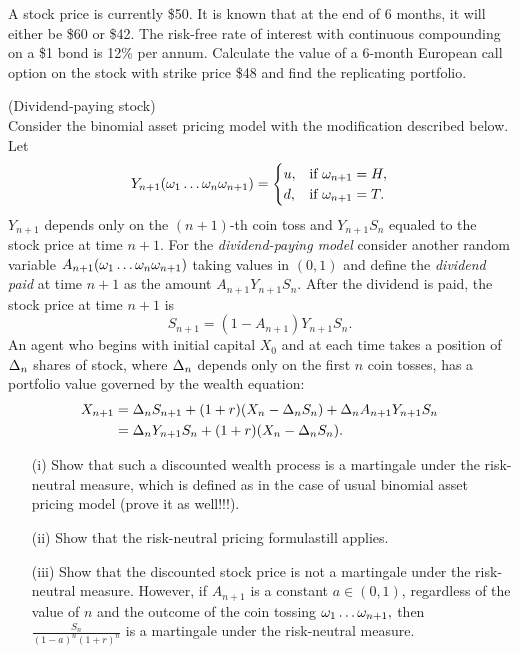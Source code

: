 \begin{problem}
 A stock price is currently \$50.  It is known that at the end of 6
  months, it will either be \$60 or \$42.  The risk-free rate of
  interest with continuous compounding on a \$1 bond is 12\% per annum.
  Calculate the value of a 6-month European call option on the stock
  with strike price \$48 and find the replicating portfolio.

\begin{sol}

\end{sol}
\end{problem}

\begin{problem}
 (Dividend-paying stock) \\
Consider the binomial asset pricing model
with the modification described below. Let
\[
Y_{n+1}(\omega_1\dots\omega_n\omega_{n+1})=
\begin{cases}
u,&\text{if }\omega_{n+1}=H,\\
d,&\text{if }\omega_{n+1}=T.
\end{cases}
\]
\ni $Y_{n+1}$ depends only on the $(n+1)$-th coin toss and $Y_{n+1}S_n$ equaled to the
stock price at time $n+1$. For the \emph{dividend-paying model} consider another random
variable $A_{n+1}(\omega_1\dots\omega_n\omega_{n+1})$ taking values in $(0,1)$ and define
the \emph{dividend paid} at time $n+1$ as the amount $A_{n+1}Y_{n+1}S_n.$ After the dividend
is paid, the stock price at time $n+1$ is
\[
S_{n+1}=(1-A_{n+1})Y_{n+1}S_n.
\]
\ni An agent who begins with initial capital $X_0$ and at each time takes a position of
$\Delta_n$ shares of stock, where $\Delta_n$ depends only on the first $n$ coin tosses, has
a portfolio value governed by the wealth equation:
\begin{align}
X_{n+1}&=\Delta_n S_{n+1}+(1+r) (X_n-\Delta_n S_n) +\Delta_n A_{n+1} Y_{n+1} S_n \\
&=\Delta_n Y_{n+1} S_n+(1+r)(X_n-\Delta_n S_n).
\end{align}
\begin{enumerate}
\item[(i)] Show that such a discounted wealth process is a martingale under the
risk-neutral measure, which is defined as in the case of usual binomial asset pricing model
(prove it as well!!!).

\item[(ii)] Show that the risk-neutral pricing formulastill applies.

\item[(iii)] Show that the discounted stock price is not a martingale under the
risk-neutral measure. However, if $A_{n+1}$ is a constant $a\in(0,1)$, regardless of the value of
$n$  and the outcome of the coin tossing $\omega_1\dots\omega_{n+1},$ then $\frac{S_n}{(1-a)^n(1+r)^n}$ is
a martingale under the risk-neutral measure.
\end{enumerate}

\begin{sol}

\end{sol}
\end{problem}

